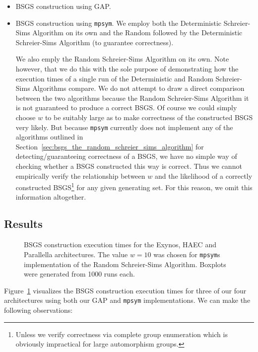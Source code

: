 \begin{itemize}
\item BSGS construction using GAP.

\item BSGS construction using \texttt{mpsym}. We employ both the Deterministic
Schreier-Sims Algorithm on its own and the Random followed by the Deterministic
Schreier-Sims Algorithm (to guarantee correctness).

We also emply the Random Schreier-Sims Algorithm on its own. Note however, that
we do this with the sole purpose of demonstrating how the execution times of a
single run of the Deterministic and Random Schreier-Sims Algorithms compare.
%
We do not attempt to draw a direct comparison between the two algorithms
because the Random Schreier-Sims Algorithm it is not guaranteed to produce a
correct BSGS.
%
Of course we could simply choose $w$ to be suitably large as to make
correctness of the constructed BSGS very likely.
%
But because \texttt{mpsym} currently does not implement any of the algorithms
outlined in Section~\ref{sec:bsgs_the_random_schreier_sims_algorithm} for
detecting/guaranteeing correctness of a BSGS, we have no simple way of checking
whether a BSGS constructed this way is correct. Thus we cannot empirically
verify the relationship between $w$ and the likelihood of a correctly
constructed BSGS\footnote{Unless we verify correctness via complete group
enumeration which is obviously impractical for large automorphism groups.} for
any given generating set. For this reason, we omit this information altogether.
\end{itemize}

\subsection{Results}

\begin{figure}
  \centering
  
  
  \caption{BSGS construction execution times for the Exynos, HAEC and
           Parallella architectures. The value $w = 10$ was chosen for
           \texttt{mpsym}s implementation of the Random Schreier-Sims Algorithm.
           Boxplots were generated from 1000 runs each.}
  \label{fig:bsgs_boxplot}
\end{figure}

Figure~\ref{fig:bsgs_boxplot} visualizes the BSGS construction execution times
for three of our four architectures using both our GAP and \texttt{mpsym}
implementations.  We can make the following observations:

